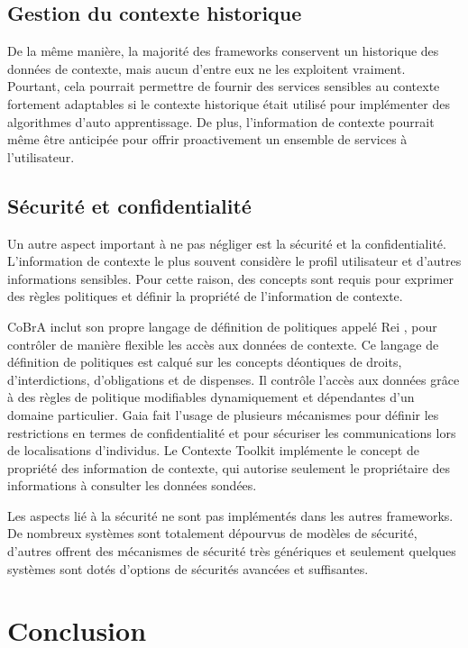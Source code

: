 \subsection{Gestion du contexte historique}

De la même manière, la majorité des frameworks conservent un historique des
données de contexte, mais aucun d'entre eux ne les exploitent vraiment.
Pourtant, cela pourrait permettre de fournir des services sensibles au contexte
fortement adaptables si le contexte historique était utilisé pour implémenter
des algorithmes d'auto apprentissage. De plus, l'information de contexte
pourrait même être anticipée pour offrir proactivement un ensemble de services à
l'utilisateur.

\subsection{Sécurité et confidentialité}

Un autre aspect important à ne pas négliger est la sécurité et la
confidentialité. L'information de contexte le plus souvent considère le profil
utilisateur et d'autres informations sensibles. Pour cette raison, des concepts
sont requis pour exprimer des règles politiques et définir la propriété de
l'information de contexte. 

CoBrA inclut son propre langage de définition de politiques appelé Rei
\cite{kagal_policy_2005}, pour contrôler de manière flexible les accès aux
données de contexte. Ce langage de définition de politiques est calqué sur les
concepts déontiques de droits, d'interdictions, d'obligations et de dispenses.
Il contrôle l'accès aux données grâce à des règles de politique modifiables
dynamiquement et dépendantes d'un domaine particulier. Gaia fait l'usage de
plusieurs mécanismes pour définir les restrictions en termes de confidentialité
et pour sécuriser les communications lors de localisations d'individus. Le
Contexte Toolkit implémente le concept de propriété des information de contexte,
qui autorise seulement le propriétaire des informations à consulter les données
sondées.

Les aspects lié à la sécurité ne sont pas implémentés dans les autres
frameworks. De nombreux systèmes sont totalement dépourvus de modèles de
sécurité, d'autres offrent des mécanismes de sécurité très génériques et
seulement quelques systèmes sont dotés d'options de sécurités avancées et
suffisantes.

\section{Conclusion}


